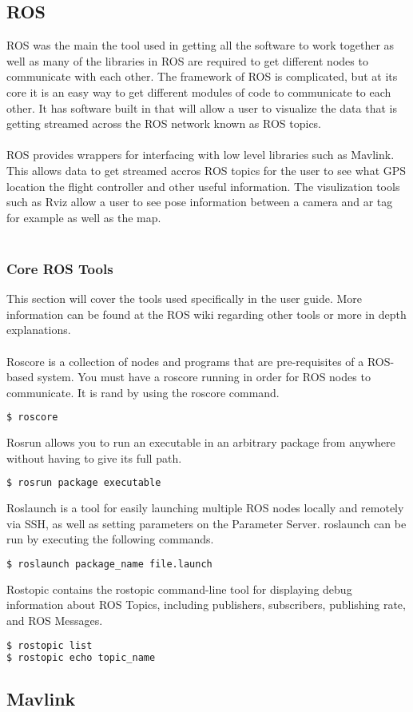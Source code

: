 \subsection{ROS}
ROS was the main the tool used in getting all the software to work together as well as many of the libraries in ROS are required to get different nodes to communicate with each other. The framework of ROS is complicated, but at its core it is an easy way to get different modules of code to communicate to each other. It has software built in that will allow a user to visualize the data that is getting streamed across the ROS network known as ROS topics.\\
\\
ROS provides wrappers for interfacing with low level libraries such as Mavlink. This allows data to get streamed accros ROS topics for the user to see what GPS location the flight controller and other useful information. The visulization tools such as Rviz allow a user to see pose information between a camera and ar tag for example as well as the map.\\
\\
\subsubsection{Core ROS Tools}
This section will cover the tools used specifically in the user guide. More information can be found at the ROS wiki regarding other tools or more in depth explanations.\\
\\
Roscore is a collection of nodes and programs that are pre-requisites of a ROS-based system. You must have a roscore running in order for ROS nodes to communicate. It is rand by using the roscore command.
\begin{lstlisting}[language=bash]
$ roscore
\end{lstlisting}
Rosrun allows you to run an executable in an arbitrary package from anywhere without having to give its full path.
\begin{lstlisting}[language=bash]
$ rosrun package executable
\end{lstlisting}
Roslaunch is a tool for easily launching multiple ROS nodes locally and remotely via SSH, as well as setting parameters on the Parameter Server. roslaunch can be run by executing the following commands.
\begin{lstlisting}[language=bash]
$ roslaunch package_name file.launch
\end{lstlisting}
Rostopic contains the rostopic command-line tool for displaying debug information about ROS Topics, including publishers, subscribers, publishing rate, and ROS Messages.
\begin{lstlisting}[language=bash]
$ rostopic list
$ rostopic echo topic_name
\end{lstlisting}
\subsection{Mavlink}